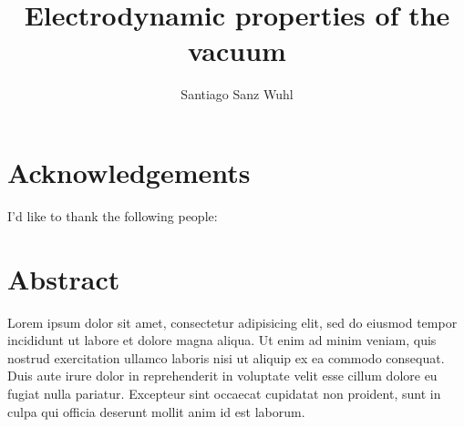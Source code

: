 \documentclass[a4paper,palatino,11pt,twoside]{thesis}
\title{Electrodynamic properties of the vacuum}
\author{Santiago Sanz Wuhl}
\begin{document}
    \startpreamble
    
    
    \section*{Acknowledgements}
    I'd like to thank the following people:
    
    \newpage
    \section*{Abstract}
    Lorem ipsum dolor sit amet, consectetur adipisicing elit, sed do eiusmod tempor incididunt ut labore et dolore magna aliqua. Ut enim ad minim veniam, quis nostrud exercitation ullamco laboris nisi ut aliquip ex ea commodo consequat. Duis aute irure dolor in reprehenderit in voluptate velit esse cillum dolore eu fugiat nulla pariatur. Excepteur sint occaecat cupidatat non proident, sunt in culpa qui officia deserunt mollit anim id est laborum.
    
    \tableofcontents
    \listoffigures
    \listoftables
    
    \cleardoublepage
    \markboth{\nomname}{\nomname}
    
    \printnomenclature[2cm]
    
    \stoppreamble
    
    

    
    
\end{document}
